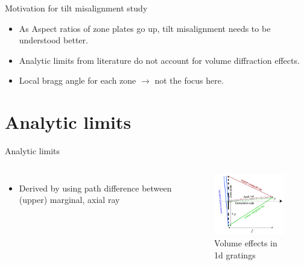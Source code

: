 \documentclass{beamer}
\begin{document}
\begin{frame}{Motivation for tilt misalignment study}
	\begin{itemize}
		\item As Aspect ratios of zone plates go up\footnotemark {}, tilt misalignment needs to be understood better.
		\item Analytic limits\footnotemark {} from literature do not account for volume diffraction effects.
		\item Local bragg angle for each zone $\rightarrow$ not the focus here.
	\end{itemize}
\end{frame}


\section{Analytic limits}

\begin{frame}{Analytic limits}
	\begin{block}{}
		\begin{columns}[onlytextwidth,T]
			\column{\dimexpr\linewidth-30mm-10mm}
			\begin{itemize}
				\item Derived by using path difference between (upper) marginal, axial ray \footnotemark
					

			\end{itemize}
			\column{30mm}
			\begin{figure}
				\hspace*{-1cm}\includegraphics[width=50mm]{zp_schematic}
				\caption{Volume effects in 1d gratings}
			\end{figure}
		\end{columns}

	\end{block}
\end{frame}
\end{document}
